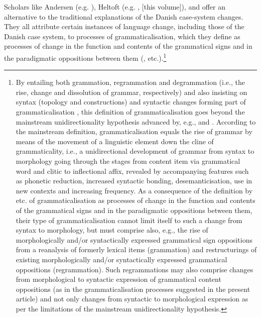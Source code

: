\documentclass[output=paper]{langsci/langscibook}
\begin{document}
Scholars like Andersen (e.g. \citeyear[143--144]{Andersen2010}), Heltoft (e.g. \citeyear{Heltoft2010}, \citeyear{chapters/07_heltoft} [this volume]), and \citet{Petersen2018} offer an alternative to the traditional explanations of the Danish case-system changes. They all attribute certain instances of language change, including those of the Danish case system, to processes of grammaticalisation, which they define as processes of change in the function and contents of the grammatical signs and in the paradigmatic oppositions between them (\cites{Andersen2006b}[123]{Andersen2010}[xi, 7–8, 11–17]{Nørgård-Sørensen2011}[261–262]{Nørgård-Sørensen2015}, etc.).\footnote{By entailing both grammation, regrammation and degrammation (i.e., the rise, change and dissolution of grammar, respectively) and also insisting on syntax (topology and constructions) and syntactic changes forming part of grammaticalisation \citep[43–45]{Nørgård-Sørensen2011}, this definition of grammaticalisation goes beyond the mainstream unidirectionality hypothesis advanced by, e.g., \citet[7]{HopperTraugott2003} and \citet[12, 121–123]{Lehmann1995}. According to the mainstream definition, grammaticalisation equals the rise of grammar by means of the movement of a linguistic element down the cline of grammaticality, i.e., a unidirectional development of grammar from syntax to morphology going through the stages from content item via grammatical word and clitic to inflectional affix, revealed by accompanying features such as phonetic reduction, increased syntactic bonding, desemanticisation, use in new contexts and increasing frequency. As a consequence of the definition by \citet{Nørgård-Sørensen2011} etc. of grammaticalisation as processes of change in the function and contents of the grammatical signs and in the paradigmatic oppositions between them, their type of grammaticalisation cannot limit itself to such a change from syntax to morphology, but must comprise also, e.g., the rise of morphologically and/or syntactically expressed grammatical sign oppositions from a reanalysis of formerly lexical items (grammation) and restructurings of existing morphologically and/or syntactically expressed grammatical oppositions (regrammation). Such regrammations may also comprise changes from morphological to syntactic expression of grammatical content oppositions (as in the grammaticalisation processes suggested in the present article) and not only changes from syntactic to morphological expression as per the limitations of the mainstream unidirectionality hypothesis.}
\end{document}
